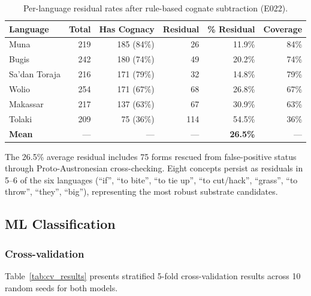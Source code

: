 \documentclass[12pt]{article}
\begin{document}
\begin{table}[H]
\centering
\caption{Per-language residual rates after rule-based cognate subtraction (E022).}
\label{tab:residuals}
\begin{tabular}{lrrrrr}
\toprule
Language & Total & Has Cognacy & Residual & \% Residual & Coverage \\
\midrule
Muna         & 219 & 185 (84\%) &  26 & 11.9\% & 84\% \\
Bugis        & 242 & 180 (74\%) &  49 & 20.2\% & 74\% \\
Sa'dan Toraja & 216 & 171 (79\%) &  32 & 14.8\% & 79\% \\
Wolio        & 254 & 171 (67\%) &  68 & 26.8\% & 67\% \\
Makassar     & 217 & 137 (63\%) &  67 & 30.9\% & 63\% \\
Tolaki       & 209 &  75 (36\%) & 114 & 54.5\% & 36\% \\
\midrule
\textbf{Mean} & --- & --- & --- & \textbf{26.5\%} & --- \\
\bottomrule
\end{tabular}
\end{table}

The 26.5\% average residual includes 75 forms rescued from false-positive status through Proto-Austronesian cross-checking.
Eight concepts persist as residuals in 5--6 of the six languages (``if'', ``to bite'', ``to tie up'', ``to cut/hack'', ``grass'', ``to throw'', ``they'', ``big''), representing the most robust substrate candidates.

\subsection{ML Classification}
\label{sec:results_ml}

\subsubsection{Cross-validation}

Table~\ref{tab:cv_results} presents stratified 5-fold cross-validation results across 10 random seeds for both models.
\end{document}
